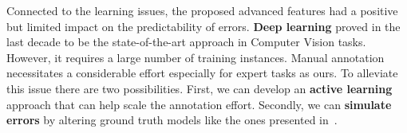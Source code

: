     Connected to the learning issues, the proposed advanced features had a positive but limited impact on the predictability of errors.
    \textbf{Deep learning} proved in the last decade to be the state-of-the-art approach in Computer Vision tasks.
    However, it requires a large number of training instances.
    Manual annotation necessitates a considerable effort especially for expert tasks as ours.
    To alleviate this issue there are two possibilities.
    First, we can develop an \textbf{active learning} approach that can help scale the annotation effort.
    Secondly, we can \textbf{simulate errors} by altering ground truth models like the ones presented in~\parencite{rottensteiner2012isprs}.
